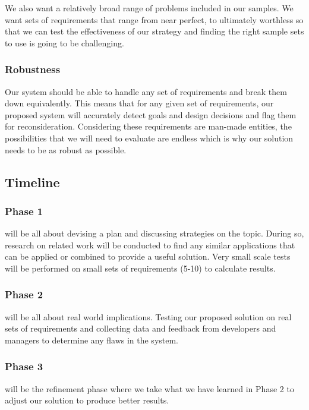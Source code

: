 \documentclass[format=acmlarge]{acmart}
\begin{document}
We also want a relatively broad range of problems included in our samples. We want sets of requirements that range from near perfect, to ultimately worthless so that we can test the effectiveness of our strategy and finding the right sample sets to use is going to be challenging.

\subsubsection{Robustness}
Our system should be able to handle any set of requirements and break them down equivalently. This means that for any given set of requirements, our proposed system will accurately detect goals and design decisions and flag them for reconsideration. Considering these requirements are man-made entities, the possibilities that we will need to evaluate are endless which is why our solution needs to be as robust as possible.

\subsection{Timeline}
\subsubsection{Phase 1}
 will be all about devising a plan and discussing strategies on the topic. During so, research on related work will be conducted to find any similar applications that can be applied or combined to provide a useful solution. Very small scale tests will be performed on small sets of requirements (5-10) to calculate results.

\subsubsection{Phase 2}
 will be all about real world implications. Testing our proposed solution on real sets of requirements and collecting data and feedback from developers and managers to determine any flaws in the system.

\subsubsection{Phase 3}
 will be the refinement phase where we take what we have learned in Phase 2 to adjust our solution to produce better results.
\end{document}
